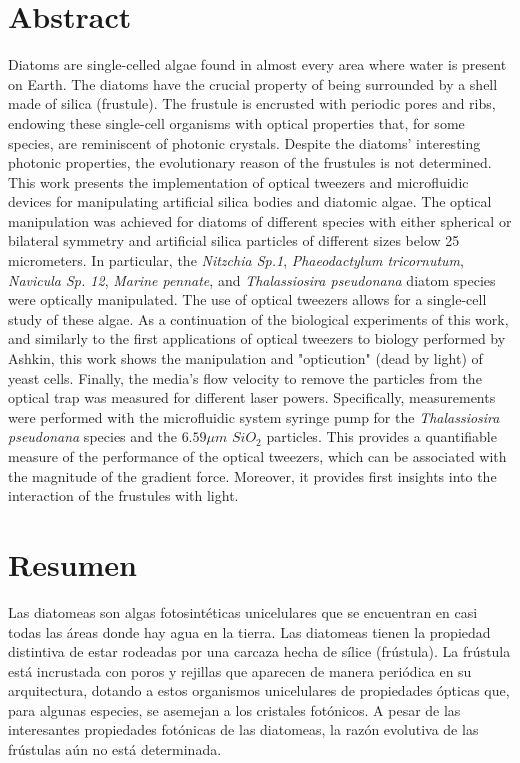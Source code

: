 \documentclass[letterpaper,12pt,oneside]{book}
\begin{document}
\section*{Abstract}
Diatoms are single-celled algae found in almost every area where water is present on Earth. The diatoms have the crucial property of being surrounded by a shell made of silica (frustule). The frustule is encrusted with periodic pores and ribs, endowing these single-cell organisms with optical properties that, for some species, are reminiscent of photonic crystals. Despite the diatoms' interesting photonic properties, the evolutionary reason of the frustules is not determined.\\\noindent
This work presents the implementation of optical tweezers and microfluidic devices for manipulating artificial silica bodies and diatomic algae. The optical manipulation was achieved for diatoms of different species with either spherical or bilateral symmetry and artificial silica particles of different sizes below 25 micrometers. In particular, the \textit{Nitzchia Sp.1}, \textit{Phaeodactylum tricornutum}, \textit{Navicula Sp. 12}, \textit{Marine pennate}, and \textit{Thalassiosira pseudonana} diatom species were optically manipulated. The use of optical tweezers allows for a single-cell study of these algae. As a continuation of the biological experiments of this work, and similarly to the first applications of optical tweezers to biology performed by Ashkin, this work shows the manipulation and "opticution" (dead by light) of yeast cells. Finally, the media's flow velocity to remove the particles from the optical trap was measured for different laser powers. Specifically, measurements were performed with the microfluidic system syringe pump for the \textit{Thalassiosira pseudonana} species and the $6.59 \mu m$ $SiO_2$ particles. This provides a quantifiable measure of the performance of the optical tweezers, which can be associated with the magnitude of the gradient force. Moreover, it provides first insights into the interaction of the frustules with light.\newpage 
\section*{Resumen}
Las diatomeas son algas fotosintéticas unicelulares que se encuentran en casi todas las áreas donde hay agua en la tierra. Las diatomeas tienen la propiedad distintiva de estar rodeadas por una carcaza hecha de sílice (frústula). La frústula está incrustada con poros y rejillas que aparecen de manera periódica en su arquitectura, dotando a estos organismos unicelulares de propiedades ópticas que, para algunas especies, se asemejan a los cristales fotónicos. A pesar de las interesantes propiedades fotónicas de las diatomeas, la razón evolutiva de las frústulas aún no está determinada.
\end{document}
